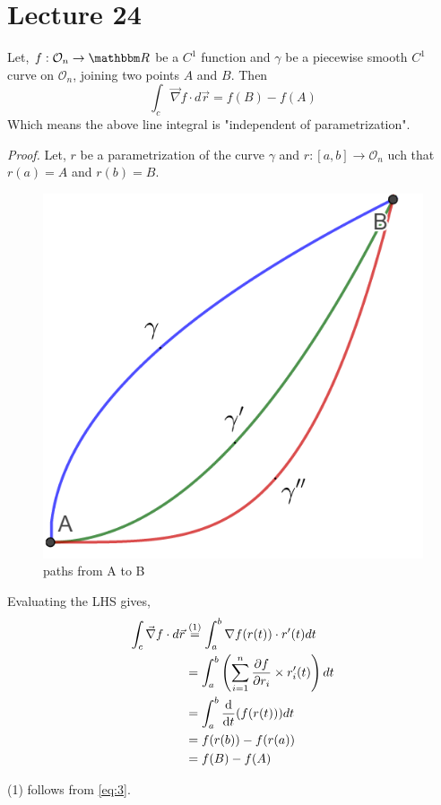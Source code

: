 \documentclass[Analysis-3]{subfiles}
\begin{document}
\chapter*{Lecture 24} %
\setcounter{chapter}{24} %
\setcounter{section}{0}
\begin{Thm}{}{}\label{thm24:1}
    Let, $f: \mathcal{O}_n \to \R$ be a $C^1$ function and $\gamma$ be a piecewise smooth $C^1$ curve on $\mathcal{O}_n$, joining two points $A$ and $B$. Then
    \[\int_c \vec{\nabla}f\cdot d\vec{r} = f(B)-f(A)\]
    Which means the above line integral is "independent of parametrization".
\end{Thm}

\textit{Proof.} Let, $r$ be a parametrization of the curve $\gamma$ and $r :[a,b] \to \mathcal{O}_n$ uch that $r(a)=A$ and $r(b)=B$.

\begin{figure}
    \centering
    \includegraphics[width=.78\linewidth]{figures/lec-24.1.png}
    \caption{paths from A to B}
\end{figure}

Evaluating the LHS gives,
\begin{align*}
    \int_c \vec{\nabla}f\cdot d\vec{r} & \overset{\mathrm{(1)}}{=} \int_a^b \nabla f(r(t)) \cdot r'(t) dt \\
    &= \int_a^b \left(\sum_{i=1}^{n} \pdv{f}{r_i}\times r_i'(t) \right) dt \\
    &=\int_a^b \dv{t}(f(r(t))) dt\\
    &= f(r(b)) - f(r(a)) \\
    &= f(B) - f(A)
\end{align*}
\begin{center}
    (1) follows from \ref{eq:3}.
\end{center}
\end{document}
